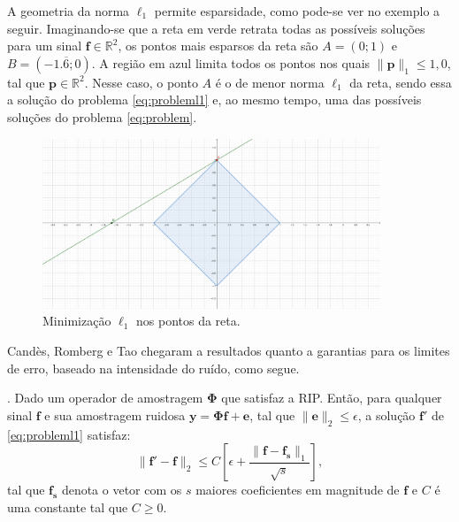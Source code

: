 \documentclass[cic,tc]{iiufrgs}
\renewcommand{\vec}[1]{\bm{#1}}
\begin{document}
A geometria da norma $\ell_1$ permite esparsidade, como pode-se ver no exemplo a seguir. Imaginando-se 
que a reta em verde retrata todas as possíveis soluções para um sinal $\vec{f} \in \mathbb{R}^2$, os pontos
mais esparsos da reta são $A=(0;1)$ e $B=(-1.\overline{6};0)$. A região em azul limita todos os pontos 
nos quais $\lVert\vec{p}\rVert_1 \le 1,0$, tal que $\vec{p} \in \mathbb{R}^2$. Nesse caso, o ponto $A$ é o 
de menor norma $\ell_1$ da reta, sendo essa a solução do problema \eqref{eq:probleml1} e, ao mesmo tempo, 
uma das possíveis soluções do problema \eqref{eq:problem}.
\begin{figure}[h]
    \caption{Minimização $\ell_1$ nos pontos da reta.}
    \begin{center}
        \includegraphics[width=0.9\textwidth]{img/l1ball}
    \end{center}
    \label{fig:l1ball}
\end{figure}

Candès, Romberg e Tao chegaram a resultados quanto a garantias para os limites de erro, baseado na 
intensidade do ruído, como segue.
\begin{teorema}
    \cite{candes2006stable}. 
    Dado um operador de amostragem $\mathbf{\Phi}$ que satisfaz a RIP.
    Então, para qualquer sinal $\vec{f}$ e sua amostragem ruidosa $\vec{y} = \mathbf{\Phi}\vec{f} + \vec{e}$, 
    tal que $\lVert \vec{e} \rVert_2 \le \epsilon$, a solução $\vec{f}'$ de \eqref{eq:probleml1} satisfaz:
    \begin{equation*}
        \lVert \vec{f}' - \vec{f} \rVert_2 \le C \left[ \epsilon + \frac{\lVert \vec{f} - \vec{f_s} \rVert_1}{\sqrt{s}} \right],
    \end{equation*}
    tal que $\vec{f_s}$ denota o vetor com os $s$ maiores coeficientes em magnitude de $\vec{f}$ e $C$ é uma
    constante tal que $C \ge 0$.
\end{teorema}
\end{document}
